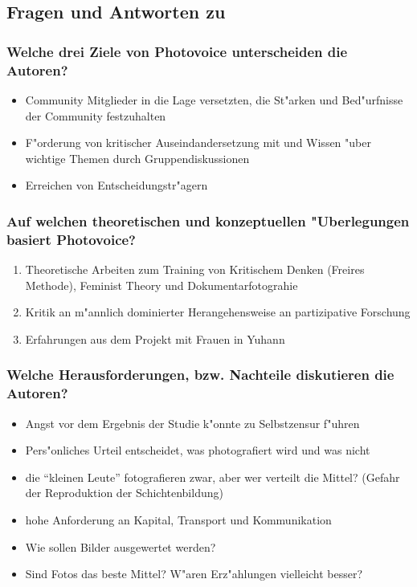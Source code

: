 \subsection{Fragen und Antworten zu \textcite{wang_photovoice:_1997}}
\subsubsection{Welche drei Ziele von Photovoice unterscheiden die Autoren?}
\begin{itemize}
        \item Community Mitglieder in die Lage versetzten, die St"arken und Bed"urfnisse der Community festzuhalten
        \item F"orderung von kritischer Auseindandersetzung mit und Wissen "uber wichtige Themen durch Gruppendiskussionen
        \item Erreichen von Entscheidungstr"agern
\end{itemize}

\subsubsection{Auf welchen theoretischen und konzeptuellen "Uberlegungen basiert Photovoice?}
\begin{enumerate}
        \item Theoretische Arbeiten zum Training von Kritischem Denken (Freires Methode), Feminist Theory und Dokumentarfotograhie
        \item Kritik an m"annlich dominierter Herangehensweise an partizipative Forschung
        \item Erfahrungen aus dem Projekt mit Frauen in Yuhann
\end{enumerate}

\subsubsection{Welche Herausforderungen, bzw. Nachteile diskutieren die Autoren?}
\begin{itemize}
        \item Angst vor dem Ergebnis der Studie k"onnte zu Selbstzensur f"uhren
        \item Pers"onliches Urteil entscheidet, was photografiert wird und was nicht
        \item die ``kleinen Leute'' fotografieren zwar, aber wer verteilt die Mittel? (Gefahr der Reproduktion der Schichtenbildung)
        \item hohe Anforderung an Kapital, Transport und Kommunikation
        \item Wie sollen Bilder ausgewertet werden?
        \item Sind Fotos das beste Mittel? W"aren Erz"ahlungen vielleicht besser?
\end{itemize}

